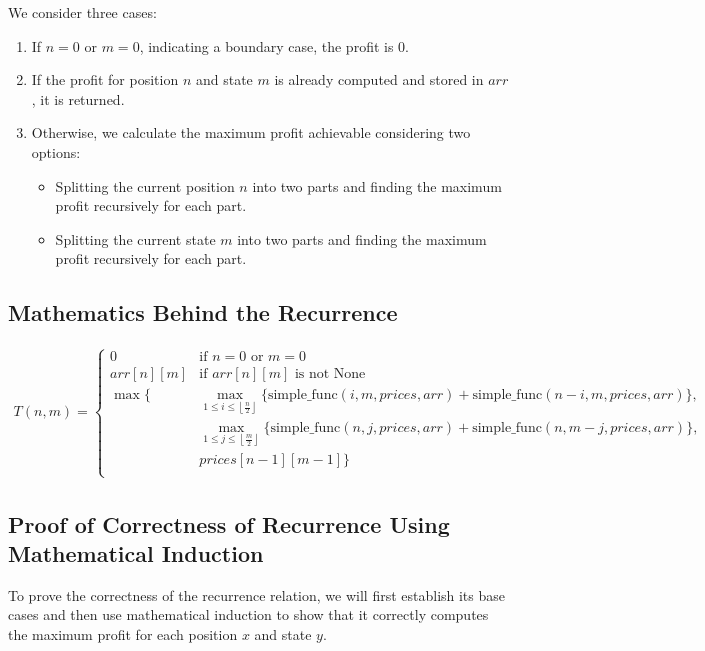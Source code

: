 \documentclass{article}
\begin{document}
We consider three cases:
\begin{enumerate}
    \item If \( n = 0 \) or \( m = 0 \), indicating a boundary case, the profit is \( 0 \).
    \item If the profit for position \( n \) and state \( m \) is already computed and stored in \( arr \), it is returned.
    \item Otherwise, we calculate the maximum profit achievable considering two options:
        \begin{itemize}
            \item Splitting the current position \( n \) into two parts and finding the maximum profit recursively for each part.
            \item Splitting the current state \( m \) into two parts and finding the maximum profit recursively for each part.
        \end{itemize}
\end{enumerate}
 
\subsection{Mathematics Behind the Recurrence}

\begin{align*}
T(n, m) = \begin{cases} 
0 & \text{if } n = 0 \text{ or } m = 0 \\
arr[n][m] & \text{if } arr[n][m] \text{ is not None} \\
\max \Biggl\{ 
& \max \limits_{1 \leq i \leq \left\lfloor \frac{n}{2} \right\rfloor} \{ \text{simple\_func}(i, m, prices, arr) + \text{simple\_func}(n - i, m, prices, arr) \}, \\
& \max \limits_{1 \leq j \leq \left\lfloor \frac{m}{2} \right\rfloor} \{ \text{simple\_func}(n, j, prices, arr) + \text{simple\_func}(n, m - j, prices, arr) \}, \\
& prices[n - 1][m - 1] 
\Biggr\} \\
\end{cases} 
\end{align*}


\subsection{Proof of Correctness of Recurrence  Using Mathematical Induction }

To prove the correctness of the recurrence relation, we will first establish its base cases and then use mathematical induction to show that it correctly computes the maximum profit for each position \( x \) and state \( y \).
\end{document}
